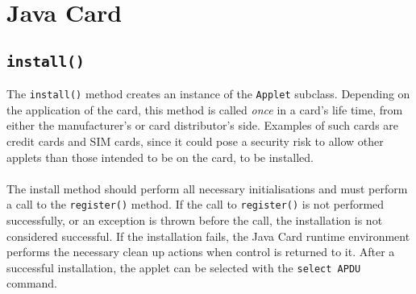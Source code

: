\section{Java Card}\label{sec:jc}
\subsection{\texttt{install()}}
The \texttt{install()} method creates an instance of the \texttt{Applet} subclass. Depending on the application of the card, this method is called \textit{once} in a card's life time, from either the manufacturer's or card distributor's side. Examples of such cards are credit cards and SIM cards, since it could pose a security risk to allow other applets than those intended to be on the card, to be installed.\\\\
The install method should perform all necessary initialisations and must perform a call to the \texttt{register()} method. If the call to \texttt{register()} is not performed successfully, or an exception is thrown before the call, the installation is not considered successful. If the installation fails, the Java Card runtime environment performs the necessary clean up actions when control is returned to it. After a successful installation, the applet can be selected with the \texttt{select APDU} command.